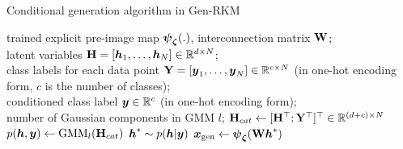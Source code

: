 \begin{algorithm}[H]
\caption{Conditional generation algorithm in Gen-RKM}
\label{alg-con-gen-rkm}
\begin{algorithmic}[1]
    \Require trained explicit pre-image map $\boldsymbol{\psi}_{\boldsymbol{\zeta}}(.)$, interconnection matrix $\mathbf{W}$; \\
    latent variables $\mathbf{H} = [\boldsymbol{h}_1,\dots,\boldsymbol{h}_N] \in \mathbb{R}^{d\times N}$; \\
            class labels for each data point $\mathbf{Y} = [\boldsymbol{y}_1,\dots,\boldsymbol{y}_N] \in \mathbb{R}^{c\times N}$ (in one-hot encoding form, $c$ is the number of classes);\\
            conditioned class label $\boldsymbol{y} \in \mathbb{R}^{c}$ (in one-hot encoding form);\\
            number of Gaussian components in GMM $l$;
    \State $\mathbf{H}_{cat} \gets [\mathbf{H}^\top; \mathbf{Y}^\top]^\top \in \mathbb{R}^{(d+c)\times N}$
    \State $p(\boldsymbol{h},\boldsymbol{y}) \gets \text{GMM}_{l}(\mathbf{H}_{cat})$
    \State $\boldsymbol{h}^* \sim p(\boldsymbol{h}|\boldsymbol{y})$
    \State $\boldsymbol{x}_{\text{gen}} \gets \boldsymbol{\psi}_{\boldsymbol{\zeta}}(\mathbf{W} \boldsymbol{h}^{*})$
\end{algorithmic}
\end{algorithm}